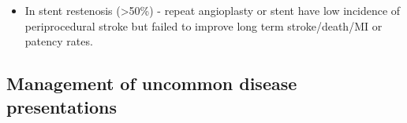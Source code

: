 \documentclass[
]{book}
\providecommand{\tightlist}{%
  \setlength{\itemsep}{0pt}\setlength{\parskip}{0pt}}
\begin{document}
\begin{itemize}
  \begin{itemize}
  \tightlist
  \item
    In stent restenosis (\textgreater50\%) - repeat angioplasty or stent have
    low incidence of periprocedural stroke but failed to improve
    long term stroke/death/MI or patency rates.
    \citet{chungPercutaneousInterventionCarotid2016a}
  \end{itemize}
\end{itemize}

\hypertarget{management-of-uncommon-disease-presentations}{%
\subsection{Management of uncommon disease presentations}\label{management-of-uncommon-disease-presentations}}
\end{document}
